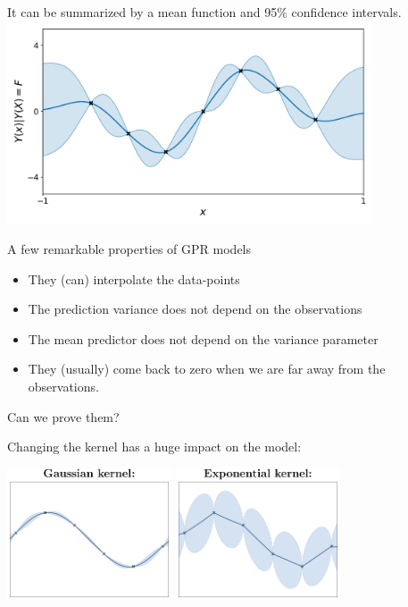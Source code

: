 \documentclass{beamer}
\begin{document}
\begin{frame}{}
    \vspace{5mm}
    It can be summarized by a mean function and 95\% confidence intervals.\\
    \centering
    \includegraphics[height=6cm]{figures/python/gp_model}
\end{frame}


\begin{frame}{}
A few remarkable properties of GPR models
\begin{itemize}
	\item They (can) interpolate the data-points
	\item The prediction variance does not depend on the observations
	\item The mean predictor does not depend on the variance parameter
	\item They (usually) come back to zero when we are far away from the observations.
\end{itemize}
Can we prove them?
\end{frame}


\begin{frame}{}
Changing the kernel \alert{has a huge impact on the model}:\\
\vspace{5mm}
\begin{center}
\includegraphics[height=3.9cm]{figures/Fig2-GP-rbf} \qquad
\includegraphics[height=3.9cm]{figures/Fig2-GP-exp}
\end{center}
\end{frame}
\end{document}
